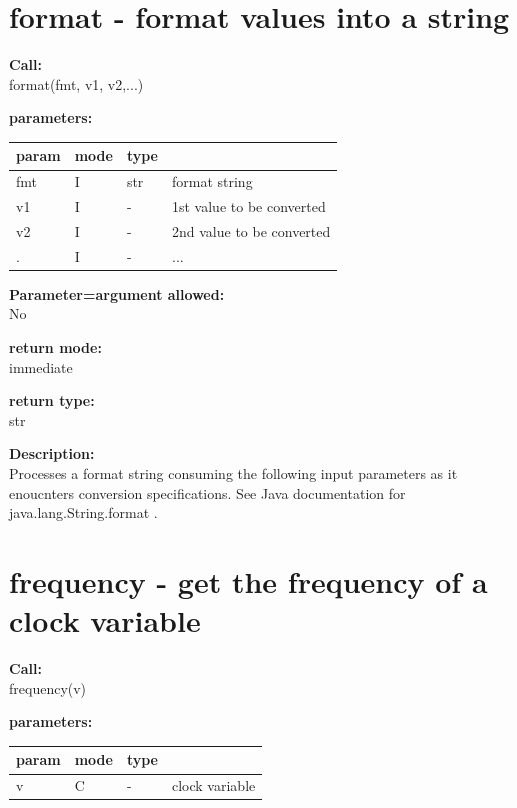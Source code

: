     \section{format - format values into a string}\label{sec:ifformat}
        
        
        {\bf Call:} \\
        format(fmt, v1, v2,...)
        
        {\bf parameters:} \\
        \begin{tabular}{| l | l | l | l |}
        \hline
        param  & mode & type & \\
        \hline \hline
        fmt & I & str & format string \\ \hline
        v1  & I &  -  & 1st value to be converted \\ \hline
        v2  & I &  -  & 2nd value to be converted \\ \hline
        .   & I &  -  & ... \\ \hline
        \end{tabular}
        
        {\bf Parameter=argument allowed:} \\
        No
        
        {\bf return mode:} \\
        immediate

        {\bf return type:} \\
        str
        
        {\bf Description:} \\
        Processes a format string consuming the following input parameters as it
        enoucnters conversion specifications. See Java documentation for
        java.lang.String.format .
 

    \section{frequency - get the frequency of a clock variable}\label{sec:iffrequency}
        
        {\bf Call:} \\
        frequency(v)
        
        {\bf parameters:} \\
        \begin{tabular}{| l | l | l | l |}
        \hline
        param  & mode & type & \\
        \hline \hline
        v & C & - & clock variable \\ \hline
        \end{tabular}
        
